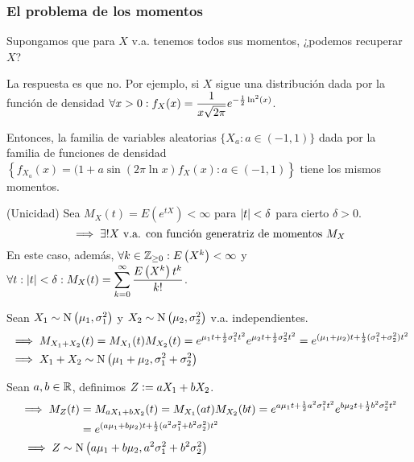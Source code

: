 \subsubsection{El problema de los momentos}

Supongamos que para $X$ v.a. tenemos todos sus momentos, ¿podemos recuperar $X$?

La respuesta es que no. Por ejemplo, si $X$ sigue una distribución dada por la función de densidad $\displaystyle \forall x > 0 : f_X(x) = \frac{1}{x\sqrt{2\pi}} e^{-\frac{1}{2}\ln^2(x)}$.

Entonces, la familia de variables aleatorias $\{X_a : a \in (-1, 1)\}$ dada por la familia de funciones de densidad $\left\{f_{X_a}(x) = (1+a\sin{(2\pi \ln{x}) f_X(x)} : a \in (-1, 1)\right\}$ tiene los mismos momentos. %

\begin{teo}(Unicidad)
	Sea $M_X(t) = E\left(e^{tX}\right) < \infty$ para $\left|t\right| < \delta$ para cierto $\delta > 0$.
	\[\implies \exists ! X \text{ v.a. con función generatriz de momentos }M_X\]
	En este caso, además, $\forall k \in \mathbb{Z}_{\geq 0} : E\left(X^k\right) < \infty$ y $\displaystyle \forall t : \left|t\right| < \delta : M_X(t) = \sum_{k=0}^{\infty} \frac{E\left(X^k\right)t^k}{k!}$.
\end{teo}

\begin{ejem}
	Sean $X_1\sim \operatorname{N}\left(\mu_1, \sigma_1^2\right)$ y $X_2\sim \operatorname{N}\left(\mu_2, \sigma_2^2\right)$ v.a. independientes.
	\[\begin{aligned}
			 & \implies M_{X_1+X_2}(t) = M_{X_1}(t)M_{X_2}(t) = e^{\mu_1t + \frac{1}{2}\sigma_1^2t^2}e^{\mu_2t + \frac{1}{2}\sigma_2^2t^2} = e^{(\mu_1+\mu_2)t + \frac{1}{2}(\sigma_1^2+\sigma_2^2)t^2} \\
			 & \implies X_1 + X_2 \sim \operatorname{N}\left(\mu_1+\mu_2, \sigma_1^2+\sigma_2^2\right)
		\end{aligned}\]

	Sean $a, b \in \mathbb{R}$, definimos $Z\vcentcolon= aX_1 + bX_2$.
	\[\begin{aligned}
			 & \begin{aligned}
				   \implies M_Z(t) & = M_{aX_1+bX_2}(t) = M_{X_1}(at)M_{X_2}(bt) = e^{a\mu_1t + \frac{1}{2}a^2\sigma_1^2t^2}e^{b\mu_2t + \frac{1}{2}b^2\sigma_2^2t^2} \\
				                   & = e^{(a\mu_1+b\mu_2)t + \frac{1}{2}(a^2\sigma_1^2+b^2\sigma_2^2)t^2}
			   \end{aligned} \\
			 & \implies Z \sim \operatorname{N}\left(a\mu_1+b\mu_2, a^2\sigma_1^2+b^2\sigma_2^2\right)
		\end{aligned}\]
\end{ejem}

